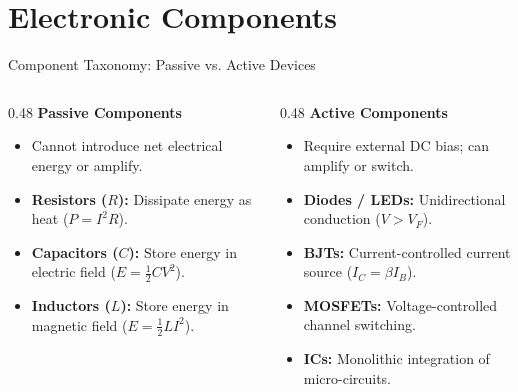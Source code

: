 
\section{Electronic Components}

\begin{frame}{Component Taxonomy: Passive vs. Active Devices}
    \begin{columns}[T]
        \begin{column}{0.48\textwidth}
            \textbf{Passive Components}
            \begin{itemize}
                \item Cannot introduce net electrical energy or amplify.
                \item \textbf{Resistors ($R$):} Dissipate energy as heat ($P = I^2 R$).
                \item \textbf{Capacitors ($C$):} Store energy in electric field ($E = \frac{1}{2}CV^2$).
                \item \textbf{Inductors ($L$):} Store energy in magnetic field ($E = \frac{1}{2}LI^2$).
            \end{itemize}
        \end{column}
        \begin{column}{0.48\textwidth}
            \textbf{Active Components}
            \begin{itemize}
                \item Require external DC bias; can amplify or switch.
                \item \textbf{Diodes / LEDs:} Unidirectional conduction ($V > V_F$).
                \item \textbf{BJTs:} Current-controlled current source ($I_C = \beta I_B$).
                \item \textbf{MOSFETs:} Voltage-controlled channel switching.
                \item \textbf{ICs:} Monolithic integration of micro-circuits.
            \end{itemize}
        \end{column}
    \end{columns}
\end{frame}

